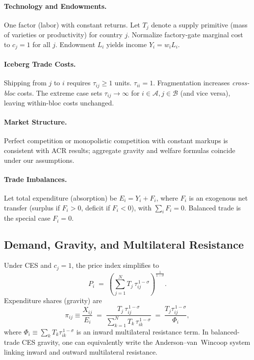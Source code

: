 \documentclass[11pt]{article}
\begin{document}
\paragraph{Technology and Endowments.}
One factor (labor) with constant returns. Let $T_j$ denote a supply primitive (mass of varieties or productivity) for country $j$. Normalize factory-gate marginal cost to $c_j=1$ for all $j$. Endowment $L_i$ yields income $Y_i = w_i L_i$.

\paragraph{Iceberg Trade Costs.}
Shipping from $j$ to $i$ requires $\tau_{ij} \ge 1$ units. $\tau_{ii}=1$. Fragmentation increases \emph{cross-bloc} costs. The extreme case sets $\tau_{ij}\to\infty$ for $i\in \mathcal{A}, j\in \mathcal{B}$ (and vice versa), leaving within-bloc costs unchanged.

\paragraph{Market Structure.}
Perfect competition or monopolistic competition with constant markups is consistent with ACR results; aggregate gravity and welfare formulas coincide under our assumptions.

\paragraph{Trade Imbalances.}
Let total expenditure (absorption) be $E_i = Y_i + F_i$, where $F_i$ is an exogenous net transfer (surplus if $F_i>0$, deficit if $F_i<0$), with $\sum_i F_i=0$. Balanced trade is the special case $F_i=0$.

\subsection*{Demand, Gravity, and Multilateral Resistance}

Under CES and $c_j=1$, the price index simplifies to
\begin{equation}
P_i \;=\; \left(\sum_{j=1}^N T_j \,\tau_{ij}^{\,1-\sigma} \right)^{\frac{1}{1-\sigma}}.
\end{equation}
Expenditure shares (gravity) are
\begin{equation}
\pi_{ij} \equiv \frac{X_{ij}}{E_i} \;=\; \frac{T_j \,\tau_{ij}^{\,1-\sigma}}{\displaystyle \sum_{k=1}^N T_k \,\tau_{ik}^{\,1-\sigma}} \;=\; \frac{T_j \tau_{ij}^{\,1-\sigma}}{\Phi_i},
\label{eq:gravity}
\end{equation}
where $\Phi_i \equiv \sum_{k} T_k \tau_{ik}^{\,1-\sigma}$ is an inward multilateral resistance term. In balanced-trade CES gravity, one can equivalently write the Anderson--van~Wincoop system linking inward and outward multilateral resistance.
\end{document}
